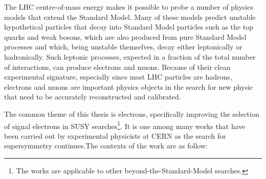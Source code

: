 The LHC centre-of-mass energy makes it possible to probe a number of physics
models that extend the Standard Model. Many of these models predict unstable
hypothetical particles that decay into Standard Model particles such as the top
quarks and weak bosons, which are also produced from pure Standard Model
processes and which, being unstable themselves, decay either leptonically or
hadronically. Such leptonic processes, expected in a fraction of the total
number of interactions, can produce electrons and muons. Because of their clean
experimental signature, especially since most LHC particles are hadrons,
electrons and muons are important physics objects in the search for new physic
that need to be accurately reconstructed and calibrated.

The common theme of this thesis is electrons, specifically improving the
selection of signal electrons in SUSY searches\footnote{The works are
	applicable to other beyond-the-Standard-Model searches.}. It is one among many
works that have been carried out by experimental physicists at CERN as the
search for supersymmetry continues.The contexts of the work are as follow:


